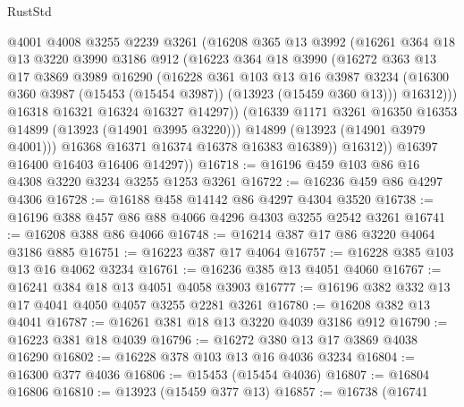\begin{lexlean}{RustStd}
\begin{coremodule}
{\begin{coremodule}
{{{{{{{{{{{{{{{{{{{{{{{{{{{{{{{{{{{{{                  @4001
                  @4008
                  @3255
                  @2239
                  @3261
                  (@16208
                    @365
                    @13
                    @3992
                    (@16261
                      @364
                      @18
                      @13
                      @3220
                      @3990
                      @3186
                      @912
                      (@16223
                        @364
                        @18
                        @3990
                        (@16272
                          @363
                          @13
                          @17
                          @3869
                          @3989
                          @16290
                          (@16228
                            @361
                            @103
                            @13
                            @16
                            @3987
                            @3234
                            (@16300 @360 @3987 (@15453 (@15454 @3987)) (@13923 (@15459 @360 @13)))
                            @16312)))
                      @16318
                      @16321
                      @16324
                      @16327
                      @14297))
                  (@16339 @1171 @3261 @16350 @16353 @14899 (@13923 (@14901 @3995 @3220)))
                  @14899
                  (@13923 (@14901 @3979 @4001)))
                @16368
                @16371
                @16374
                @16378
                @16383
                @16389))
            @16312))
        @16397
        @16400
        @16403
        @16406
        @14297))
@16718 := @16196 @459 @103 @86 @16 @4308 @3220 @3234 @3255 @1253 @3261
@16722 := @16236 @459 @86 @4297 @4306
@16728 := @16188 @458 @14142 @86 @4297 @4304 @3520
@16738 := @16196 @388 @457 @86 @88 @4066 @4296 @4303 @3255 @2542 @3261
@16741 := @16208 @388 @86 @4066
@16748 := @16214 @387 @17 @86 @3220 @4064 @3186 @885
@16751 := @16223 @387 @17 @4064
@16757 := @16228 @385 @103 @13 @16 @4062 @3234
@16761 := @16236 @385 @13 @4051 @4060
@16767 := @16241 @384 @18 @13 @4051 @4058 @3903
@16777 := @16196 @382 @332 @13 @17 @4041 @4050 @4057 @3255 @2281 @3261
@16780 := @16208 @382 @13 @4041
@16787 := @16261 @381 @18 @13 @3220 @4039 @3186 @912
@16790 := @16223 @381 @18 @4039
@16796 := @16272 @380 @13 @17 @3869 @4038 @16290
@16802 := @16228 @378 @103 @13 @16 @4036 @3234
@16804 := @16300 @377 @4036
@16806 := @15453 (@15454 @4036)
@16807 := @16804 @16806
@16810 := @13923 (@15459 @377 @13)
@16857 := @16738
    (@16741
}}}}}}}}}}}}}}}}}}}}}}}}}}}}}}}}}}}}}
\end{coremodule}}
\end{coremodule}
\end{lexlean}
